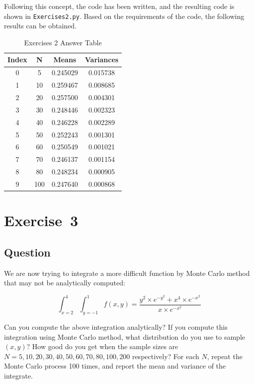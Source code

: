 \documentclass[a4paper, utf8]{ctexart}
\begin{document}
	Following this concept, the code has been written, and the resulting code is shown in \verb|Exercises2.py|. Based on the requirements of the code, the following results can be obtained.
	
	\begin{table}[http]
		\begin{center}
			\caption{Exercises 2 Answer Table}
			\begin{tabular}{c c c c}
				\hline
				Index & N & Means & Variances \\
				\hline
				0 &   5 & 0.245029 & 0.015738 \\
				1 &  10 & 0.259467 & 0.008685 \\
				2 &  20 & 0.257500 & 0.004301 \\
				3 &  30 & 0.248446 & 0.002323 \\
				4 &  40 & 0.246228 & 0.002289 \\
				5 &  50 & 0.252243 & 0.001301 \\ 
				6 &  60 & 0.250549 & 0.001021 \\
				7 &  70 & 0.246137 & 0.001154 \\
				8 &  80 & 0.248234 & 0.000905 \\
				9 & 100 & 0.247640 & 0.000868 \\
				\hline
			\end{tabular}
		\end{center}
	\end{table}
	
	\section{Exercise\ 3}
	
	\subsection{Question}
	
	We are now trying to integrate a more difficult function by Monte Carlo method that may not be analytically computed:
	
	\begin{equation}
		\int_{x=2}^{4} \int_{y=-1}^{1} f(x, y) = \dfrac{ y^2 \times e^{-y^2} + x^4 \times e^{-x^2}}{x \times e^{-x^2}}
		\nonumber
	\end{equation}
	
	Can you compute the above integration analytically? If you compute this integration using Monte Carlo method, what distribution do you use to sample $(x, y)$? How good do you get when the sample sizes are $N = 5, 10, 20, 30, 40, 50, 60, 70, 80, 100, 200$ respectively? For each $N$, repeat the Monte Carlo process 100 times, and report the mean and variance of the integrate.
	
\end{document}
